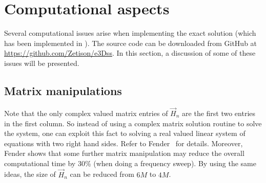 \section{Computational aspects}
\label{Sec1:computationalAspects}
Several computational issues arise when implementing the exact solution (which has been implemented in \href{mathworks.com}{\MATLAB}). The source code can be downloaded from GitHub at \href{https://github.com/Zetison/e3Dss}{https://github.com/Zetison/e3Dss}. In this section, a discussion of some of these issues will be presented.

\subsection{Matrix manipulations}
Note that the only complex valued matrix entries of $\vec{H}_n$ are the first two entries in the first column. So instead of using a complex matrix solution routine to solve the system, one can exploit this fact to solving a real valued linear system of equations with two right hand sides. Refer to Fender~\cite[pp. 18-20]{Fender1972sfa} for details. Moreover, Fender shows that some further matrix manipulation may reduce the overall computational time by 30\% (when doing a frequency sweep). By using the same ideas, the size of $\vec{H}_n$ can be reduced from $6M$ to $4M$.


